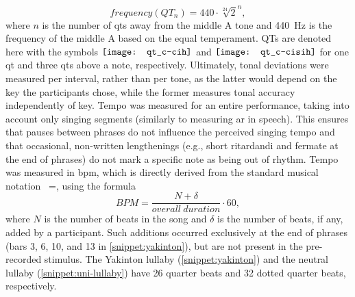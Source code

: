 %
\begin{equation}
	\label{eq:quarter_tones_formula}
	frequency(QT_n) = 440 \cdot \sqrt[24]{2}^n,
\end{equation}
\noindent
%
where $n$ is the number of \acp{qt} away from the middle A tone \citep[cf.][]{DeKlerk1979equal} and \SI{440}{\hertz} is the frequency of the middle A based on the equal temperament.
QTs are denoted here with the symbols \hspace{-0.18cm}
$\vcenter{\hbox{\texttt{[image: qt\_c-cih]}}}$ and 
$\vcenter{\hbox{\texttt{[image: qt\_c-cisih]}}}$ for one \ac{qt} and three \acp{qt} above a note, respectively.
Ultimately, tonal deviations were measured per interval, rather than per tone, as the latter would depend on the key the participants chose, while the former measures tonal accuracy independently of key.
Tempo was measured for an entire performance, taking into account only singing segments (similarly to measuring \ac{ar} in speech).
This ensures that pauses between phrases do not influence the perceived singing tempo and that occasional, non-written lengthenings (e.g., short ritardandi and fermate at the end of phrases) do not mark a specific note as being out of rhythm.
Tempo was measured in \acf{bpm}, which is directly derived from the standard musical notation \musQuarter~=, using the formula
%
\begin{equation}
	\label{eq:bpm}
	BPM = \frac{N + \delta}{overall\ duration} \cdot 60,
\end{equation}
\noindent
%
where $N$ is the number of beats in the song and $\delta$ is the number of beats, if any, added by a participant.
Such additions occurred exclusively at the end of phrases (bars 3, 6, 10, and 13 in \cref{snippet:yakinton}), but are not present in the pre-recorded stimulus.
The Yakinton lullaby (\cref{snippet:yakinton}) and the neutral lullaby (\cref{snippet:uni-lullaby}) have 26 quarter beats and 32 dotted quarter beats, respectively.

